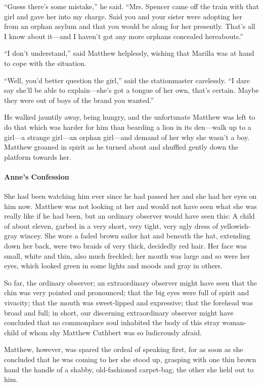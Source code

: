 \documentclass{article}
\begin{document}
``Guess there's some mistake,'' he said. ``Mrs. Spencer came off the train with that girl and gave her into my charge. Said you and your sister were adopting her from an orphan asylum and that you would be along for her presently. That's all I know about it---and I haven't got any more orphans concealed hereabouts.''

``I don't understand,'' said Matthew helplessly, wishing that Marilla was at hand to cope with the situation.

``Well, you'd better question the girl,'' said the stationmaster carelessly. ``I dare say she'll be able to explain---she's got a tongue of her own, that's certain. Maybe they were out of boys of the brand you wanted.''

He walked jauntily away, being hungry, and the unfortunate Matthew was left to do that which was harder for him than bearding a lion in its den---walk up to a girl---a strange girl---an orphan girl---and demand of her why she wasn't a boy. Matthew groaned in spirit as he turned about and shuffled gently down the platform towards her.
 
\paragraph{Anne's Confession}
She had been watching him ever since he had passed her and she had her eyes on him now. Matthew was not looking at her and would not have seen what she was really like if he had been, but an ordinary observer would have seen this: A child of about eleven, garbed in a very short, very tight, very ugly dress of yellowish-gray wincey. She wore a faded brown sailor hat and beneath the hat, extending down her back, were two braids of very thick, decidedly red hair. Her face was small, white and thin, also much freckled; her mouth was large and so were her eyes, which looked green in some lights and moods and gray in others.

So far, the ordinary observer; an extraordinary observer might have seen that the chin was very pointed and pronounced; that the big eyes were full of spirit and vivacity; that the mouth was sweet-lipped and expressive; that the forehead was broad and full; in short, our discerning extraordinary observer might have concluded that no commonplace soul inhabited the body of this stray woman-child of whom shy Matthew Cuthbert was so ludicrously afraid.

Matthew, however, was spared the ordeal of speaking first, for as soon as she concluded that he was coming to her she stood up, grasping with one thin brown hand the handle of a shabby, old-fashioned carpet-bag; the other she held out to him.
\end{document}
